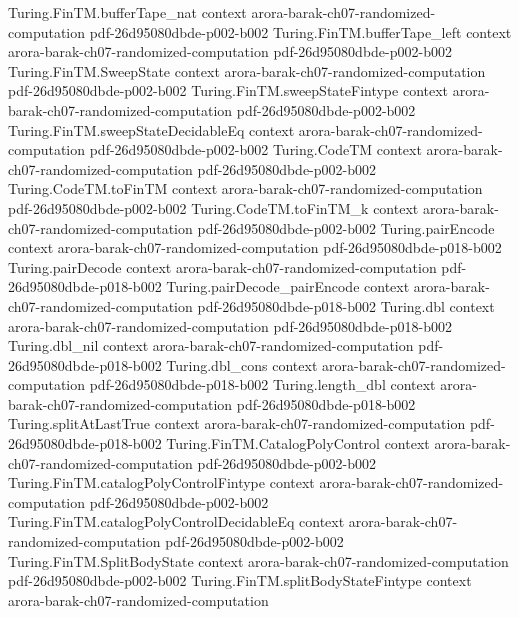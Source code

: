 \begin{theorem}
\proofstep
  {Turing.FinTM.bufferTape_nat}
  {context}
  {arora-barak-ch07-randomized-computation}
  {pdf-26d95080dbde-p002-b002}
\proofstep
  {Turing.FinTM.bufferTape_left}
  {context}
  {arora-barak-ch07-randomized-computation}
  {pdf-26d95080dbde-p002-b002}
\proofstep
  {Turing.FinTM.SweepState}
  {context}
  {arora-barak-ch07-randomized-computation}
  {pdf-26d95080dbde-p002-b002}
\proofstep
  {Turing.FinTM.sweepStateFintype}
  {context}
  {arora-barak-ch07-randomized-computation}
  {pdf-26d95080dbde-p002-b002}
\proofstep
  {Turing.FinTM.sweepStateDecidableEq}
  {context}
  {arora-barak-ch07-randomized-computation}
  {pdf-26d95080dbde-p002-b002}
\proofstep
  {Turing.CodeTM}
  {context}
  {arora-barak-ch07-randomized-computation}
  {pdf-26d95080dbde-p002-b002}
\proofstep
  {Turing.CodeTM.toFinTM}
  {context}
  {arora-barak-ch07-randomized-computation}
  {pdf-26d95080dbde-p002-b002}
\proofstep
  {Turing.CodeTM.toFinTM_k}
  {context}
  {arora-barak-ch07-randomized-computation}
  {pdf-26d95080dbde-p002-b002}
\proofstep
  {Turing.pairEncode}
  {context}
  {arora-barak-ch07-randomized-computation}
  {pdf-26d95080dbde-p018-b002}
\proofstep
  {Turing.pairDecode}
  {context}
  {arora-barak-ch07-randomized-computation}
  {pdf-26d95080dbde-p018-b002}
\proofstep
  {Turing.pairDecode_pairEncode}
  {context}
  {arora-barak-ch07-randomized-computation}
  {pdf-26d95080dbde-p018-b002}
\proofstep
  {Turing.dbl}
  {context}
  {arora-barak-ch07-randomized-computation}
  {pdf-26d95080dbde-p018-b002}
\proofstep
  {Turing.dbl_nil}
  {context}
  {arora-barak-ch07-randomized-computation}
  {pdf-26d95080dbde-p018-b002}
\proofstep
  {Turing.dbl_cons}
  {context}
  {arora-barak-ch07-randomized-computation}
  {pdf-26d95080dbde-p018-b002}
\proofstep
  {Turing.length_dbl}
  {context}
  {arora-barak-ch07-randomized-computation}
  {pdf-26d95080dbde-p018-b002}
\proofstep
  {Turing.splitAtLastTrue}
  {context}
  {arora-barak-ch07-randomized-computation}
  {pdf-26d95080dbde-p018-b002}
\proofstep
  {Turing.FinTM.CatalogPolyControl}
  {context}
  {arora-barak-ch07-randomized-computation}
  {pdf-26d95080dbde-p002-b002}
\proofstep
  {Turing.FinTM.catalogPolyControlFintype}
  {context}
  {arora-barak-ch07-randomized-computation}
  {pdf-26d95080dbde-p002-b002}
\proofstep
  {Turing.FinTM.catalogPolyControlDecidableEq}
  {context}
  {arora-barak-ch07-randomized-computation}
  {pdf-26d95080dbde-p002-b002}
\proofstep
  {Turing.FinTM.SplitBodyState}
  {context}
  {arora-barak-ch07-randomized-computation}
  {pdf-26d95080dbde-p002-b002}
\proofstep
  {Turing.FinTM.splitBodyStateFintype}
  {context}
  {arora-barak-ch07-randomized-computation}

\end{theorem}
